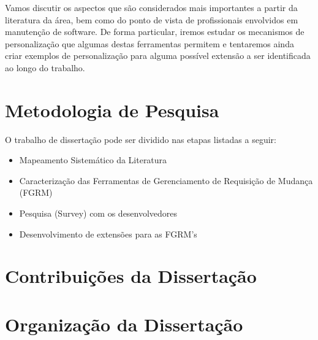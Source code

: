 Vamos discutir os aspectos que são considerados mais importantes a partir da literatura da área, bem
como do ponto de vista de profissionais envolvidos em manutenção de software. De forma particular,
iremos estudar os mecanismos de personalização que algumas destas ferramentas permitem e tentaremos
ainda criar exemplos de personalização para alguma possível extensão a ser identificada ao longo do
trabalho.

\section{Metodologia de Pesquisa}
\label{sec:intro-metodologia}

O trabalho de dissertação pode ser dividido nas etapas listadas a seguir:

\begin{itemize}[(i)]
	\item Mapeamento Sistemático da Literatura~\cite{keele2007guidelines}
	\item Caracterização das Ferramentas de Gerenciamento de Requisição de Mudança (FGRM)
	\item Pesquisa (Survey) com os desenvolvedores~\cite{wohlin2012experimentation}
	\item Desenvolvimento de extensões para as FGRM's
\end{itemize}

\section{Contribuições da Dissertação}
\label{sec:intro-contribuicao}

\section{Organização da Dissertação}
\label{sec:intro-organizacao-dissertacao}
